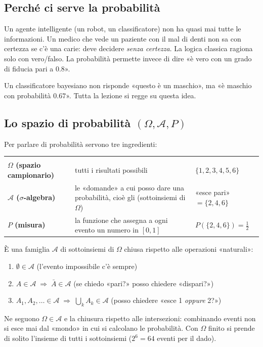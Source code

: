 
\subsection{Perché ci serve la probabilità}
\begin{intuizione}
Un agente intelligente (un robot, un classificatore) non ha quasi mai tutte le informazioni. Un medico che vede un paziente con il mal di denti non sa con certezza se c'è una carie: deve decidere \emph{senza certezza}. La logica classica ragiona solo con vero/falso. La probabilità permette invece di dire «è vero con un grado di fiducia pari a 0.8».
\end{intuizione}
Un classificatore bayesiano non risponde «questo è un maschio», ma «è maschio con probabilità $0.67$». Tutta la lezione si regge su questa idea.

\subsection{Lo spazio di probabilità $(\Omega,\mathcal{A},P)$}
Per parlare di probabilità servono tre ingredienti:

\begin{center}
\begin{tabularx}{\linewidth}{>{\bfseries}l Y l}
 &  & \\
$\Omega$ (spazio campionario) & tutti i risultati possibili & $\{1,2,3,4,5,6\}$\\
$\mathcal{A}$ ($\sigma$-algebra) & le «domande» a cui posso dare una probabilità, cioè gli  (sottoinsiemi di $\Omega$) & «esce pari» $=\{2,4,6\}$\\
$P$ (misura) & la funzione che assegna a ogni evento un numero in $[0,1]$ & $P(\{2,4,6\})=\tfrac12$\\
\end{tabularx}
\end{center}

\begin{tecnica}
È una famiglia $\mathcal{A}$ di sottoinsiemi di $\Omega$ chiusa rispetto alle operazioni «naturali»:
\begin{enumerate}
  \item $\emptyset\in\mathcal{A}$ \hfill (l'evento impossibile c'è sempre)
  \item $A\in\mathcal{A}\;\Rightarrow\;\bar{A}\in\mathcal{A}$ \hfill (se chiedo «pari?» posso chiedere «dispari?»)
  \item $A_1,A_2,\ldots\in\mathcal{A}\;\Rightarrow\;\bigcup_k A_k\in\mathcal{A}$ \hfill (posso chiedere «esce 1 \emph{oppure} 2?»)
\end{enumerate}
Ne seguono $\Omega\in\mathcal{A}$ e la chiusura rispetto alle intersezioni: combinando eventi non si esce mai dal «mondo» in cui si calcolano le probabilità. Con $\Omega$ finito si prende di solito l'insieme di tutti i sottoinsiemi ($2^6=64$ eventi per il dado).
\end{tecnica}

